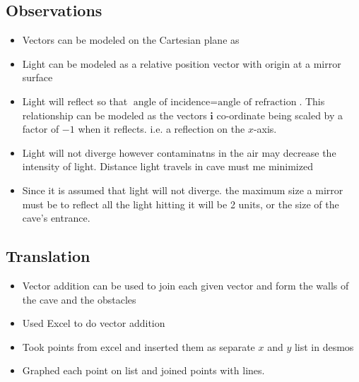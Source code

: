 \documentclass[11pt, letterpaper]{article}
\begin{document}
\subsection{Observations}
\par
\begin{itemize}
\item Vectors can be modeled on the Cartesian plane as 

\item Light can be modeled as a relative position vector with origin at a mirror surface

\item Light will reflect so that $\textrm{angle  of incidence} = \textrm{angle of refraction}$. This relationship can be modeled as the vectors $\bm{i}$ co-ordinate being scaled by a factor of $-1$ when it reflects. i.e. a reflection on the $x$-axis.

\item Light will not diverge however contaminatns in the air may decrease the intensity of light. Distance light travels in cave must me minimized

\item  Since it is assumed that light will not diverge. the maximum size a mirror must be to reflect all the light hitting it will be 2 units, or the size of the cave's entrance.
\end{itemize}





\subsection{Translation}
\par 

\begin{itemize}
\item Vector addition can be used to join each given vector and form the walls of the cave and the obstacles

\item Used Excel to do vector addition

\item Took points from excel and inserted them as separate $x$ and $y$ list in desmos

\item Graphed each point on list and joined points with lines.
\end{itemize}


\par 
\end{document}
